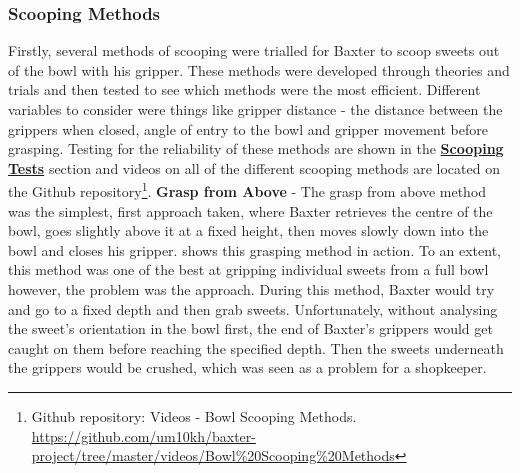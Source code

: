 \subsubsection{Scooping Methods}
Firstly, several methods of scooping were trialled for Baxter to scoop sweets out of the bowl with his gripper. These methods were developed through theories and trials and then tested to see which methods were the most efficient.  Different variables to consider were things like gripper distance - the distance between the grippers when closed, angle of entry to the bowl and gripper movement before grasping. Testing for the reliability of these methods are shown in the \hyperref[sssec:ScoopTest]{\textbf{Scooping Tests}} section and videos on all of the different scooping methods are located on the Github repository\footnote{Github repository: Videos - Bowl Scooping Methods. \url{https://github.com/um10kh/baxter-project/tree/master/videos/Bowl\%20Scooping\%20Methods}}.
\newline\newline
\textbf{Grasp from Above} - The grasp from above method was the simplest, first approach taken, where Baxter retrieves the centre of the bowl, goes slightly above it at a fixed height, then moves slowly down into the bowl and closes his gripper. \textbf{} shows this grasping method in action. To an extent, this method was one of the best at gripping individual sweets from a full bowl however, the problem was the approach. During this method, Baxter would try and go to a fixed depth and then grab sweets. Unfortunately, without analysing the sweet's orientation in the bowl first, the end of Baxter's grippers would get caught on them before reaching the specified depth. Then the sweets underneath the grippers would be crushed, which was seen as a problem for a shopkeeper. 
